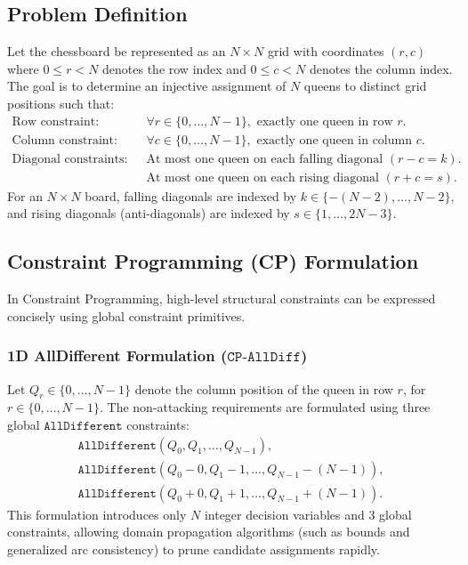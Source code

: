 \documentclass[a4paper,fleqn]{cas-sc}
\begin{document}
\subsection{Problem Definition}
Let the chessboard be represented as an $N \times N$ grid with coordinates $(r, c)$ where $0 \le r < N$ denotes the row index and $0 \le c < N$ denotes the column index. The goal is to determine an injective assignment of $N$ queens to distinct grid positions such that:
\begin{align}
    \text{Row constraint:} \quad & \forall r \in \{0, \dots, N-1\}, \text{ exactly one queen in row } r. \label{eq:row} \\
    \text{Column constraint:} \quad & \forall c \in \{0, \dots, N-1\}, \text{ exactly one queen in column } c. \label{eq:col} \\
    \text{Diagonal constraints:} \quad & \text{At most one queen on each falling diagonal } (r - c = k). \label{eq:diag1} \\
    & \text{At most one queen on each rising diagonal } (r + c = s). \label{eq:diag2}
\end{align}
For an $N \times N$ board, falling diagonals are indexed by $k \in \{-(N-2), \dots, N-2\}$, and rising diagonals (anti-diagonals) are indexed by $s \in \{1, \dots, 2N-3\}$.

\subsection{Constraint Programming (CP) Formulation}
In Constraint Programming, high-level structural constraints can be expressed concisely using global constraint primitives.

\subsubsection{1D AllDifferent Formulation ($\mathtt{CP\text{-}AllDiff}$)}
Let $Q_r \in \{0, \dots, N-1\}$ denote the column position of the queen in row $r$, for $r \in \{0, \dots, N-1\}$. The non-attacking requirements are formulated using three global $\mathtt{AllDifferent}$ constraints:
\begin{align}
    \mathtt{AllDifferent}(Q_0, Q_1, \dots, Q_{N-1}), \label{eq:cp_cols} \\
    \mathtt{AllDifferent}(Q_0 - 0, Q_1 - 1, \dots, Q_{N-1} - (N-1)), \label{eq:cp_diag1} \\
    \mathtt{AllDifferent}(Q_0 + 0, Q_1 + 1, \dots, Q_{N-1} + (N-1)). \label{eq:cp_diag2}
\end{align}
This formulation introduces only $N$ integer decision variables and 3 global constraints, allowing domain propagation algorithms (such as bounds and generalized arc consistency) to prune candidate assignments rapidly.
\end{document}
